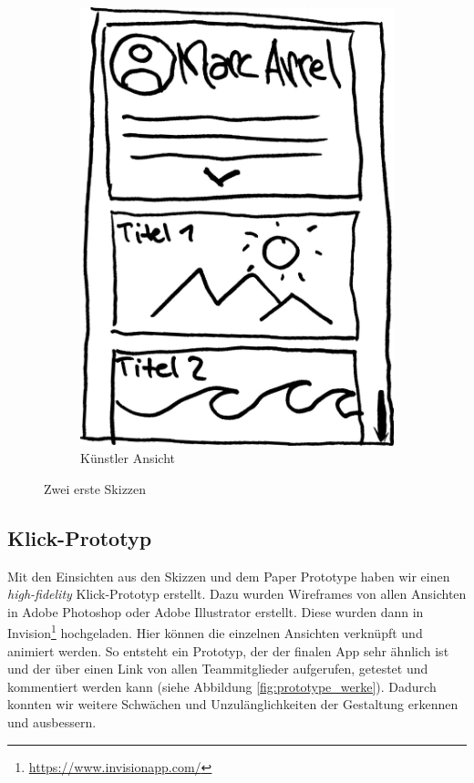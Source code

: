 \begin{figure}[width = 0.45\textwidth]
\begin{subfigure}[b]{0.22\textwidth}
        \includegraphics[width=\textwidth]{figures/kuenstler.jpg}
        \caption{Künstler Ansicht}
        \label{fig:tiger}
    \end{subfigure}
    \caption{Zwei erste Skizzen}
    \label{fig:skizzen}
\end{figure}
\subsection{Klick-Prototyp}
Mit den Einsichten aus den Skizzen und dem Paper Prototype haben wir einen \textit{high-fidelity} Klick-Prototyp erstellt. Dazu wurden Wireframes von allen Ansichten in Adobe Photoshop oder Adobe Illustrator erstellt. Diese wurden dann in Invision\footnote{\url{https://www.invisionapp.com/}} hochgeladen. Hier können die einzelnen Ansichten verknüpft und animiert werden. So entsteht ein Prototyp, der der finalen  App sehr ähnlich ist und der über einen Link von allen Teammitglieder aufgerufen, getestet und kommentiert werden kann (siehe Abbildung \ref{fig:prototype_werke}). Dadurch konnten wir weitere Schwächen und Unzulänglichkeiten der Gestaltung erkennen und ausbessern.

